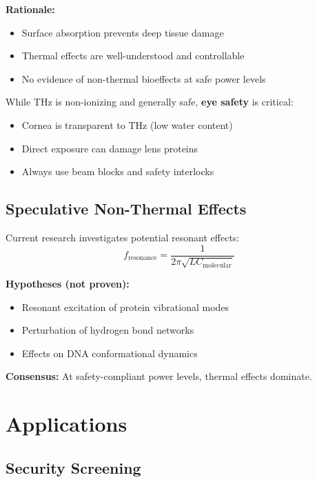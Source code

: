 \textbf{Rationale:}
\begin{itemize}
\item Surface absorption prevents deep tissue damage
\item Thermal effects are well-understood and controllable
\item No evidence of non-thermal bioeffects at safe power levels
\end{itemize}

\begin{warningbox}
While THz is non-ionizing and generally safe, \textbf{eye safety} is critical:
\begin{itemize}
\item Cornea is transparent to THz (low water content)
\item Direct exposure can damage lens proteins
\item Always use beam blocks and safety interlocks
\end{itemize}
\end{warningbox}

\subsection{Speculative Non-Thermal Effects}

Current research investigates potential resonant effects:
\begin{equation}
f_{\text{resonance}} = \frac{1}{2\pi\sqrt{LC_{\text{molecular}}}}
\end{equation}

\textbf{Hypotheses (not proven):}
\begin{itemize}
\item Resonant excitation of protein vibrational modes
\item Perturbation of hydrogen bond networks
\item Effects on DNA conformational dynamics
\end{itemize}

\textbf{Consensus:} At safety-compliant power levels, thermal effects dominate.

\section{Applications}

\subsection{Security Screening}

